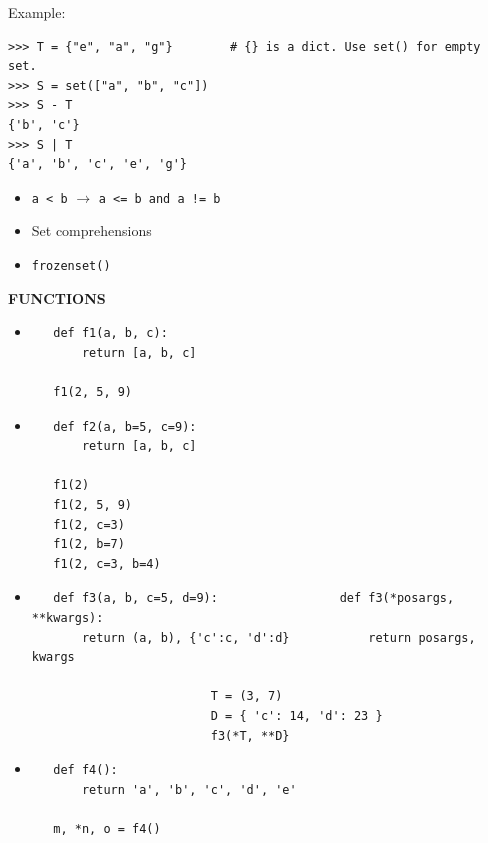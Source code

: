 \documentclass[9pt,a4wide]{extarticle}
\begin{document}
\bigskip

Example:

\begin{verbatim}
>>> T = {"e", "a", "g"}        # {} is a dict. Use set() for empty set.
>>> S = set(["a", "b", "c"])   
>>> S - T 
{'b', 'c'}
>>> S | T
{'a', 'b', 'c', 'e', 'g'}
\end{verbatim}

\begin{itemize}
\item {\tt a < b} $\rightarrow$ {\tt a <= b and a != b}
\item Set comprehensions
\item {\tt frozenset()}
\end{itemize}




\bigskip
{\LARGE\bf FUNCTIONS}

\begin{itemize}

\item 

   \begin{verbatim}
   def f1(a, b, c):
       return [a, b, c]

   f1(2, 5, 9)
   \end{verbatim}

\item

   \begin{verbatim}
   def f2(a, b=5, c=9):
       return [a, b, c]

   f1(2)
   f1(2, 5, 9)
   f1(2, c=3)
   f1(2, b=7)
   f1(2, c=3, b=4)
   \end{verbatim}

\item 

   \begin{verbatim}
   def f3(a, b, c=5, d=9):                 def f3(*posargs, **kwargs):
       return (a, b), {'c':c, 'd':d}           return posargs, kwargs

                         T = (3, 7)
                         D = { 'c': 14, 'd': 23 }
                         f3(*T, **D}
   \end{verbatim}

\item 

   \begin{verbatim}
   def f4():
       return 'a', 'b', 'c', 'd', 'e'

   m, *n, o = f4()
   \end{verbatim}

\end{itemize}
\end{document}
